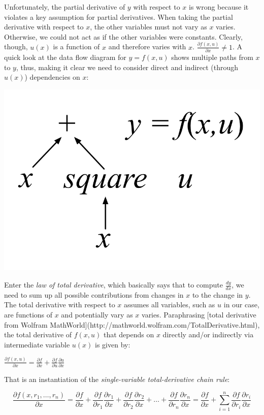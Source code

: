 \documentclass[11pt]{article}
\begin{document}
Unfortunately, the partial derivative of $y$ with respect to $x$ is wrong because it violates a key assumption for partial derivatives. When taking the partial derivative with respect to $x$, the other variables must not vary as $x$ varies. Otherwise, we could not act as if the other variables were constants. Clearly, though, $u(x)$ is a function of $x$ and therefore varies with $x$. $\frac{\partial f(x,u)}{\partial x} \neq 1$. A quick look at the data flow diagram for $y=f(x,u)$ shows multiple paths from $x$ to $y$, thus, making it clear we need to  consider direct and indirect (through $u(x)$) dependencies on $x$:

\includegraphics[scale=.9]{plus-square.png}

Enter the {\em law of total derivative}, which basically says that to compute $\frac{dy}{dx}$, we need to sum up all possible contributions from changes in $x$ to the change in $y$. The total derivative with respect to $x$ assumes all variables, such as $u$ in our case, are functions of $x$ and potentially vary as $x$ varies.   Paraphrasing [total derivative from Wolfram MathWorld](http://mathworld.wolfram.com/TotalDerivative.html), the total derivative of $f(x,u)$ that depends on $x$ directly and/or indirectly via intermediate variable $u(x)$ is given by:

$\frac{\partial f(x,u)}{\partial x} = \frac{\partial f}{\partial x} + \frac{\partial f}{\partial u}\frac{\partial u}{\partial x}$

That is an instantiation of the {\em single-variable total-derivative chain rule}:

\[
\frac{\partial f(x,r_1,\ldots,r_n)}{\partial x} = \frac{\partial f}{\partial x} + \frac{\partial f}{\partial r_1}\frac{\partial r_1}{\partial x} + \frac{\partial f}{\partial r_2}\frac{\partial r_2}{\partial x} + \ldots + \frac{\partial f}{\partial r_n}\frac{\partial r_n}{\partial x} = \frac{\partial f}{\partial x} + \sum_{i=1}^n \frac{\partial f}{\partial r_i}\frac{\partial r_i}{\partial x}
\]
\end{document}
